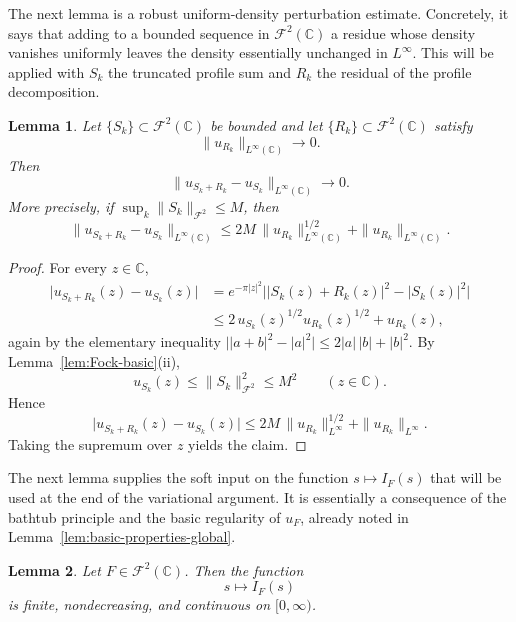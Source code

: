 \documentclass[a4paper,11pt,reqno]{amsart}
\numberwithin{equation}{section}
\theoremstyle{plain} %
\newtheorem{lemma}{Lemma}[section]
\theoremstyle{definition} %
\theoremstyle{remark}
\newcommand{\C}{\mathbb{C}}
\begin{document}
The next lemma is a robust uniform-density perturbation estimate. Concretely,
it says that adding to a bounded sequence in \(\mathcal F^2(\C)\) a residue
whose density vanishes uniformly leaves the density essentially unchanged in
\(L^\infty\). This will be applied with \(S_k\) the truncated profile sum and
\(R_k\) the residual of the profile decomposition.

\begin{lemma}\label{lem:density-perturbation-global}
Let \(\{S_k\}\subset \mathcal F^2(\C)\) be bounded and let
\(\{R_k\}\subset \mathcal F^2(\C)\) satisfy
\[
\|u_{R_k}\|_{L^\infty(\C)}\to 0.
\]
Then
\[
\|u_{S_k+R_k}-u_{S_k}\|_{L^\infty(\C)}\to 0.
\]
More precisely, if \(\sup_k \|S_k\|_{\mathcal F^2}\le M\), then
\[
\|u_{S_k+R_k}-u_{S_k}\|_{L^\infty(\C)}
\le
2M\,\|u_{R_k}\|_{L^\infty(\C)}^{1/2}
+\|u_{R_k}\|_{L^\infty(\C)}.
\]
\end{lemma}

\begin{proof}
For every \(z\in \C\),
\begin{align*}
\big|u_{S_k+R_k}(z)-u_{S_k}(z)\big|
&=
e^{-\pi |z|^2}\big||S_k(z)+R_k(z)|^2-|S_k(z)|^2\big| \\
&\le
2\,u_{S_k}(z)^{1/2}u_{R_k}(z)^{1/2}
+u_{R_k}(z),
\end{align*}
again by the elementary inequality
\(\big||a+b|^2-|a|^2\big|\le 2|a|\,|b|+|b|^2\). By
Lemma~\ref{lem:Fock-basic}(ii),
\[
u_{S_k}(z)\le \|S_k\|_{\mathcal F^2}^2\le M^2
\qquad (z\in\C).
\]
Hence
\[
\big|u_{S_k+R_k}(z)-u_{S_k}(z)\big|
\le
2M\,\|u_{R_k}\|_{L^\infty}^{1/2}
+\|u_{R_k}\|_{L^\infty}.
\]
Taking the supremum over \(z\) yields the claim.
\end{proof}

The next lemma supplies the soft input on the function \(s\mapsto I_F(s)\)
that will be used at the end of the variational argument. It is essentially a
consequence of the bathtub principle and the basic regularity of \(u_F\),
already noted in Lemma~\ref{lem:basic-properties-global}.

\begin{lemma}\label{lem:I-continuity-global}
Let \(F\in \mathcal F^2(\C)\). Then the function
\[
s\mapsto I_F(s)
\]
is finite, nondecreasing, and continuous on \([0,\infty)\).
\end{lemma}
\end{document}
